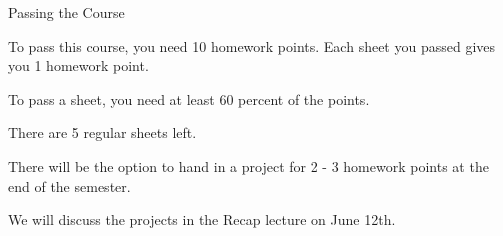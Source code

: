 \begin{frame}[fragile]{Passing the Course}

    To pass this course, you need 10 homework points. Each sheet you passed gives you 1 homework point.

    \vspace{1em}

    To pass a sheet, you need at least 60 percent of the points.

    \vspace{1em}

    There are 5 regular sheets left.

    \vspace{1em}

    There will be the option to hand in a project for 2 - 3 homework points at the end of the semester.
    
    \vspace{1em}

    We will discuss the projects in the Recap lecture on June 12th.



\end{frame}



